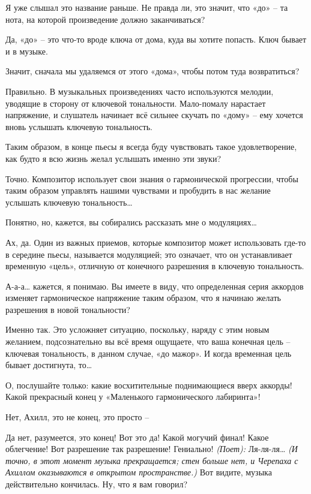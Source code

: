 \documentclass[../main.tex]{subfiles}
\begin{document}
\begin{Dialogue}
\begin{sublevel}
\begin{sublevel}
\begin{sublevel}
 Я уже слышал это название раньше. Не правда ли, это значит, что «до» \--- та нота, на которой произведение должно заканчиваться?

 Да, «до» \--- это что-то вроде ключа от дома, куда вы хотите попасть. Ключ бывает и в музыке.

 Значит, сначала мы удаляемся от этого «дома», чтобы потом туда возвратиться?

 Правильно. В музыкальных произведениях часто используются мелодии, уводящие в сторону от ключевой тональности. Мало-помалу нарастает напряжение, и слушатель начинает всё сильнее скучать по «дому» \--- ему хочется вновь услышать ключевую тональность.

 Таким образом, в конце пьесы я всегда буду чувствовать такое удовлетворение, как будто я всю жизнь желал услышать именно эти звуки?

 Точно. Композитор использует свои знания о гармонической прогрессии, чтобы таким образом управлять нашими чувствами и пробудить в нас желание услышать ключевую тональность\ldots{}

 Понятно, но, кажется, вы собирались рассказать мне о модуляциях\ldots{}

 Ах, да. Один из важных приемов, которые композитор может использовать где-то в середине пьесы, называется модуляцией; это означает, что он устанавливает временную «цель», отличную от конечного разрешения в ключевую тональность.

 А-а-а\ldots{} кажется, я понимаю. Вы имеете в виду, что определенная серия аккордов изменяет гармоническое напряжение таким образом, что я начинаю желать разрешения в новой тональности?

 Именно так. Это усложняет ситуацию, поскольку, наряду с этим новым желанием, подсознательно вы всё время ощущаете, что ваша конечная цель \--- ключевая тональность, в данном случае, «до мажор». И когда временная цель бывает достигнута, то\ldots{}

 О, послушайте только: какие восхитительные поднимающиеся вверх аккорды! Какой прекрасный конец у «Маленького гармонического лабиринта»!

 Нет, Ахилл, это не конец, это просто \---

 Да нет, разумеется, это конец! Вот это да! Какой могучий финал! Какое облегчение! Вот разрешение так разрешение! Гениально! \emph{(Поет):} Ля-ля-ля\ldots{} \emph{(И точно, в этот момент музыка прекращается; стен больше нет, и Черепаха с Ахиллом оказываются в открытом пространстве.)} Вот видите, музыка действительно кончилась. Ну, что я вам говорил?


\end{sublevel}
\end{sublevel}
\end{sublevel}
\end{Dialogue}
\end{document}

